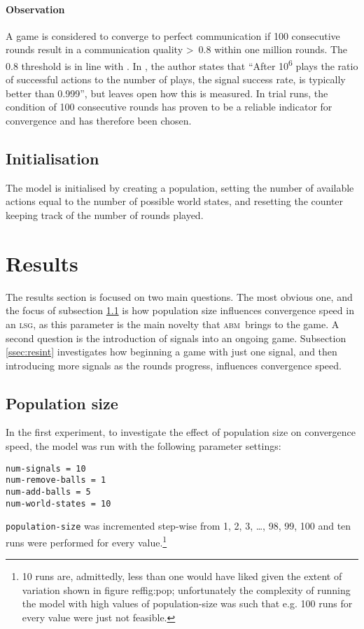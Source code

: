 \documentclass[DIV=calc,BCOR=0mm,pagesize]{scrartcl}
\newcommand{\code}[1]{\texttt{#1}}
\newcommand{\abm}{\textsc{abm}}
\newcommand{\lsg}{\textsc{lsg}}
\begin{document}
\paragraph{Observation}
A game is considered to converge to perfect communication if 100 consecutive rounds result in a communication quality >~0.8 within one million rounds.
The 0.8 threshold is in line with \citet[p.~533]{barrett_numerical_2006, barrett_dynamic_2007}.
In \citet[sec.~2, unpaginated preprint]{barrett_numerical_2006}, the author states that ``After 10\textsuperscript{6} plays the ratio of successful actions to the number of plays, the signal success rate, is typically better than 0.999'', but leaves open how this is measured.
In trial runs, the condition of 100 consecutive rounds has proven to be a reliable indicator for convergence and has therefore been chosen.

\subsection{Initialisation}
\label{ssec:modini}
The model is initialised by creating a population, setting the number of available actions equal to the number of possible world states, and resetting the counter keeping track of the number of rounds played.

\section{Results}
\label{sec:res}
The results section is focused on two main questions.
The most obvious one, and the focus of subsection \ref{ssec:respop} is how population size influences convergence speed in an \lsg, as this parameter is the main novelty that \abm\ brings to the game.
A second question is the introduction of signals into an ongoing game.
Subsection \ref{ssec:resint} investigates how beginning a game with just one signal, and then introducing more signals as the rounds progress, influences convergence speed.

\subsection{Population size}
\label{ssec:respop}
In the first experiment, to investigate the effect of population size on convergence speed, the model was run with the following parameter settings:
\begin{verbatim}
num-signals = 10
num-remove-balls = 1
num-add-balls = 5
num-world-states = 10
\end{verbatim}
\code{population-size} was incremented step-wise from 1, 2, 3, \ldots, 98, 99, 100 and ten runs were performed for every value.\footnote{10 runs are, admittedly, less than one would have liked given the extent of variation shown in figure ref{fig:pop}; unfortunately the complexity of running the model with high values of population-size was such that e.g. 100 runs for every value were just not feasible.}
\end{document}
